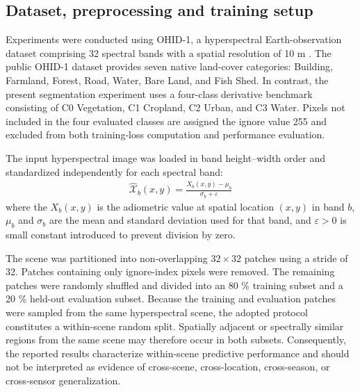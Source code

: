 \documentclass[a4paper,fleqn]{cas-dc}
\begin{document}
\subsection{Dataset, preprocessing and training setup}
Experiments were conducted using OHID-1, a hyperspectral Earth-observation dataset comprising 32 spectral bands with a spatial resolution of 10 m \cite{mani2025ohid}. The public OHID-1 dataset provides seven native land-cover categories: Building, Farmland, Forest, Road, Water, Bare Land, and Fish Shed. In contrast, the present segmentation experiment uses a four-class derivative benchmark consisting of C0 Vegetation, C1 Cropland, C2 Urban, and C3 Water. Pixels not included in the four evaluated classes are assigned the ignore value 255 and excluded from both training-loss computation and performance evaluation.

The input hyperspectral image was loaded in band height–width order and standardized independently for each spectral band:
\begin{eqnarray}
	\hat{\mathcal{X}}_b(x,y) = \frac{X_b (x,y) - \mu_b}{\sigma_b + \varepsilon}
\end{eqnarray}
where the \(X_b (x,y)\) is the adiometric value at spatial location \((x,y)\) in band \(b\), \(\mu_b\) and \(\sigma_b\) are the mean and standard deviation used for that band, and \(\varepsilon > 0\) is small constant introduced to prevent division by zero.

The scene was partitioned into non-overlapping \(32\times 32\) patches using a stride of 32. Patches containing only ignore-index pixels were removed. The remaining patches were randomly shuffled and divided into an 80 \% training subset and a 20 \% held-out evaluation subset.
Because the training and evaluation patches were sampled from the same hyperspectral scene, the adopted protocol constitutes a within-scene random split. Spatially adjacent or spectrally similar regions from the same scene may therefore occur in both subsets. Consequently, the reported results characterize within-scene predictive performance and should not be interpreted as evidence of cross-scene, cross-location, cross-season, or cross-sensor generalization.
\end{document}
